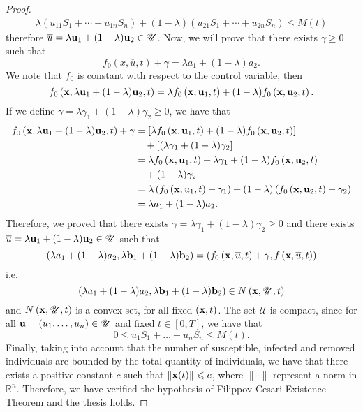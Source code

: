 \documentclass[a4paper,10pt]{article}
\theoremstyle{remark}
\begin{document}
\begin{proof}
$$\begin{array}{l}
\lambda\left( u_{11}S_{1}+\cdots+ u_{1 n}S_{n}\right)+(1-\lambda)\left( u_{21}S_{1}+\cdots+ u_{2 n}S_{n}\right)\leq M(t)
\end{array}
$$
therefore $\overline{u}=\lambda \bold{u}_{1}+(1-\lambda) \bold{u}_{2}\in \mathscr{U}$.
\newline
Now, we will prove that there exists $\gamma \geq 0$ such that
$$f_{0}\left(x, \overline{ u}, t\right)+\gamma=\lambda a_{1}+(1-\lambda) a_{2}.$$
We note that $f_0$ is constant with respect to the control variable, then
$$
f_{0}\left(\bold{x}, \lambda \bold{u}_{1}+(1-\lambda) \bold{u}_{2}, t\right)=\lambda f_{0}\left(\bold{x}, \bold{u}_{1}, t\right)+(1-\lambda) f_{0}\left(\bold{x}, \bold{u}_{2}, t\right).
$$
If we define $\gamma=\lambda \gamma_{1}+(1-\lambda) \gamma_{2} \geq 0$, we have that
$$
\begin{aligned}
f_{0}\left(\bold{x},\lambda \bold{u}_{1}+(1-\lambda) \bold{u}_{2}, t\right)+\gamma &=\left[\lambda f_{0}\left(\bold{x},\bold{u}_{1}, t\right)+(1-\lambda) f_{0}\left(\bold{x}, \bold{u}_{2}, t\right)\right]\\ &\quad +\left[(\lambda \gamma_{1}+(1-\lambda) \gamma_{2}\right] \\
&=\lambda f_{0}\left(\bold{x},\bold{u}_{1}, t\right)+\lambda \gamma_{1}+(1-\lambda) f_{0}\left(\bold{x}, \bold{u}_{2}, t\right)\\ &\quad +(1-\lambda) \gamma_{2} \\
&=\lambda\left(f_{0}\left(\bold{x},  u_{1}, t\right)+\gamma_{1}\right)+(1-\lambda)\left(f_{0}\left(\bold{x}, \bold{u}_{2}, t\right)+\gamma_{2}\right) \\
&=\lambda a_{1}+(1-\lambda) a_{2}.
\end{aligned}
$$
Therefore, we proved that there exists 
$\gamma=\lambda \gamma_{1}+(1-\lambda) \gamma_{2} \geq 0$ and there exists $\overline{ u}=\lambda \bold{u}_{1}+(1-\lambda) \bold{u}_{2} \in \mathscr{U}$
such that 
$$\left(\lambda {a_{1}}+(1-\lambda) {a_{2}}, \lambda \bold{b}_{1}+(1-\lambda) \bold{b}_{2}\right)=\left(f_{0}\left(\bold{x}, \overline{ u}, t\right)+\gamma , f\left(\bold{x}, \overline{ u}, t\right)\right)$$
i.e.
$$\left(\lambda a_{1}+(1-\lambda) a_{2}, \lambda \bold{b}_{1}+(1-\lambda) \bold{b}_{2}\right) \in N\left(\bold{x}, \mathscr{U}, t\right)$$
and $N\left(\bold{x}, \mathscr{U}, t\right)$ is a convex set, for all fixed $(\bold{x},t)$.
\newline
The set $\mathscr{U}$ is compact, since for all $\bold{u}= \left( u_{1}, \ldots,  u_{n}\right)\in \mathscr{U}$ and fixed $t\in [0,T]$, we have that
$$0 \leq  u_{1}S_1+\ldots+ u_{n}S_n \leq M(t).$$ 
Finally, taking into account that the number of susceptible, infected and removed individuals are bounded by the total quantity of individuals, we have that there exists a positive constant $c$ such that $\|\bold{x}(t)\| \leqslant c$, where $\|\cdot\|$ represent a norm in $\mathbb{R}^{n}$. Therefore, we have verified the hypothesis of Filippov-Cesari Existence Theorem and the thesis holds.
\end{proof}
\end{document}

